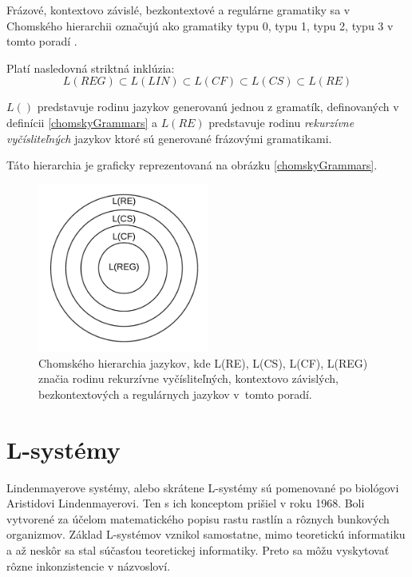 Frázové, kontextovo závislé, bezkontextové a regulárne gramatiky sa v Chomského hierarchii označujú ako gramatiky typu 0, typu 1, typu 2, typu 3 v tomto poradí \cite{handbook}.

\begin{definition}
Platí nasledovná striktná inklúzia: \[L(REG) \subset L(LIN) \subset L(CF) \subset L(CS) \subset L(RE)\]

\end{definition}

$L()$ predstavuje rodinu jazykov generovanú jednou z gramatík, definovaných v definícii \ref{chomskyGrammars} a $L(RE)$ predstavuje rodinu \textit{rekurzívne vyčísliteľných} jazykov ktoré sú generované frázovými gramatikami.

Táto hierarchia je graficky reprezentovaná na obrázku \ref{chomskyGrammars}.

\begin{figure}[hbt]
	\centering
	\includegraphics[width=0.5\textwidth]{obrazky-figures/chomskyHierarchy.png}
	\caption{Chomského hierarchia jazykov, kde L(RE), L(CS), L(CF), L(REG) značia rodinu rekurzívne vyčísliteľných, kontextovo závislých, bezkontextových a regulárnych jazykov v~tomto poradí.}
	\label{chomskyHierarchy}
\end{figure}

\chapter{L-systémy}
\label{lsystem}

Lindenmayerove systémy, alebo skrátene L-systémy sú pomenované po biológovi Aristidovi Lindenmayerovi. Ten s ich konceptom prišiel v roku 1968. Boli vytvorené za účelom matematického popisu rastu rastlín a rôznych bunkových organizmov\cite{algBeauty}. Základ L-systémov vznikol samostatne, mimo teoretickú informatiku a až neskôr sa stal súčasťou teoretickej informatiky. Preto sa môžu vyskytovať rôzne inkonzistencie v názvosloví.

